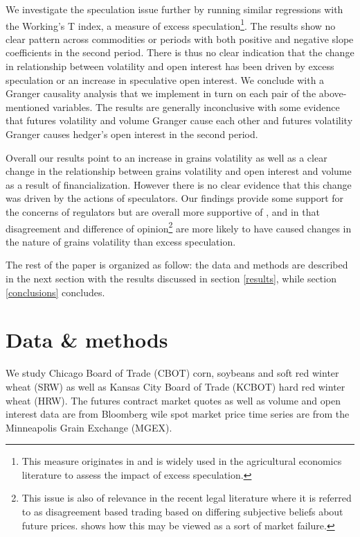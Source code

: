 \documentclass[12pt,]{article}
\let\rmarkdownfootnote\footnote%
\def\footnote{\protect\rmarkdownfootnote}
\begin{document}
We investigate the speculation issue further by running similar
regressions with the Working's T index, a measure of excess
speculation\footnote{This measure originates in
  \citet{working_speculation_1960} and is widely used in the
  agricultural economics literature to assess the impact of excess
  speculation.}. The results show no clear pattern across commodities or
periods with both positive and negative slope coefficients in the second
period. There is thus no clear indication that the change in
relationship between volatility and open interest has been driven by
excess speculation or an increase in speculative open interest. We
conclude with a Granger causality analysis that we implement in turn on
each pair of the above-mentioned variables. The results are generally
inconclusive with some evidence that futures volatility and volume
Granger cause each other and futures volatility Granger causes hedger's
open interest in the second period.

Overall our results point to an increase in grains volatility as well as
a clear change in the relationship between grains volatility and open
interest and volume as a result of financialization. However there is no
clear evidence that this change was driven by the actions of
speculators. Our findings provide some support for the concerns of
regulators but are overall more supportive of
\citet{goldstein_information_2015}, \citet{singleton_investor_2013} and
\citet{stein_informational_1987} in that disagreement and difference of
opinion\footnote{This issue is also of relevance in the recent legal
  literature \citep[\citet{stout_uncertainty_2011}]{stout_why_1998}
  where it is referred to as disagreement based trading based on
  differing subjective beliefs about future prices.
  \citet{stout_uncertainty_2011} shows how this may be viewed as a sort
  of market failure.} are more likely to have caused changes in the
nature of grains volatility than excess speculation.

The rest of the paper is organized as follow: the data and methods are
described in the next section with the results discussed in section
\ref{results}, while section \ref{conclusions} concludes.

\newpage

\hypertarget{data-methods}{%
\section{Data \& methods}\label{data-methods}}

We study Chicago Board of Trade (CBOT) corn, soybeans and soft red
winter wheat (SRW) as well as Kansas City Board of Trade (KCBOT) hard
red winter wheat (HRW). The futures contract market quotes as well as
volume and open interest data are from Bloomberg wile spot market price
time series are from the Minneapolis Grain Exchange (MGEX).
\end{document}
